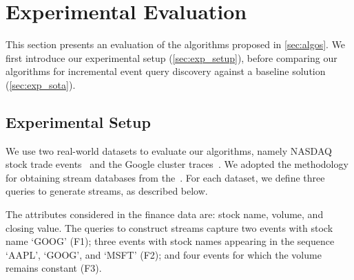 \section{Experimental Evaluation}
\label{sec:evaluation}

This section presents an evaluation of the algorithms proposed in
\autoref{sec:algos}. We
first introduce our experimental setup (\autoref{sec:exp_setup}), before
comparing our algorithms for incremental event query discovery against a
baseline solution (\autoref{sec:exp_sota}).

\subsection{Experimental Setup}
\label{sec:exp_setup}

We use two real-world datasets to evaluate our algorithms, namely
 NASDAQ stock trade events~\cite{eodata}
and the Google cluster traces~\cite{reiss2011google}.
We adopted the methodology for obtaining stream databases from the~\cite{ilminer}.
For each dataset, we define three queries to generate streams, as described below.

The attributes considered in the finance data are:
stock name, volume, and closing value. The queries to construct streams
capture
two events with stock name `GOOG' (F1); three events with stock names
appearing in the sequence `AAPL', `GOOG', and `MSFT' (F2); and four events
for which the volume remains constant (F3).

